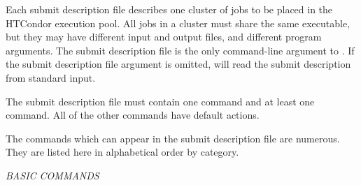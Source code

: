 Each submit description file describes one cluster of jobs to be
placed in the HTCondor execution pool. All jobs in a cluster must share
the same executable, but they may have different input and output files,
and different program arguments. The submit description file is
the only command-line argument to . If the submit description
file argument is omitted,  will read the submit description
from standard input.

The submit description file must contain 
one  command and at least one  command.
All of the other commands have default actions.

The commands which can appear in the submit description file are
numerous.  They are listed here in alphabetical order by category.

\emph{BASIC COMMANDS}
